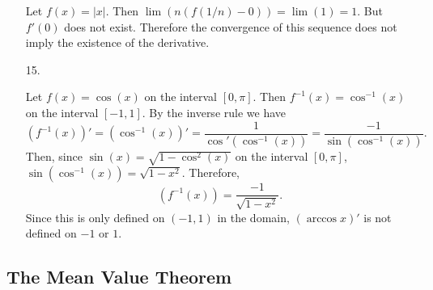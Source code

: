 \documentclass[letter paper, 11pt]{article}
\begin{document}
\begin{itemize}
        Let $f(x) = |x|$. Then $\lim(n(f(1/n) - 0)) = \lim (1) = 1$. But $f'(0)$ does not exist. Therefore the convergence of this sequence does not imply the existence of the derivative.
    
    \item[15.]
    
        Let $f(x) = \cos(x)$ on the interval $[0,\pi]$. Then $f^{-1}(x) = \cos^{-1}(x)$ on the interval $[-1,1]$. By the inverse rule we have $$(f^{-1}(x))' = (\cos^{-1}(x))' = \frac{1}{\cos'(\cos^{-1}(x))} = \frac{-1}{\sin(\cos^{-1}(x))}.$$ Then, since $\sin(x) = \sqrt{1 - \cos^2(x)}$ on the interval $[0,\pi]$, $\sin(\cos^{-1}(x)) = \sqrt{1-x^2}$. Therefore, $$(f^{-1}(x)) = \frac{-1}{\sqrt{1-x^2}}.$$ Since this is only defined on $(-1,1)$ in the domain, $(\arccos{x})'$ is not defined on $-1$ or $1$.
    
\end{itemize}

\subsection{The Mean Value Theorem}
\end{document}

